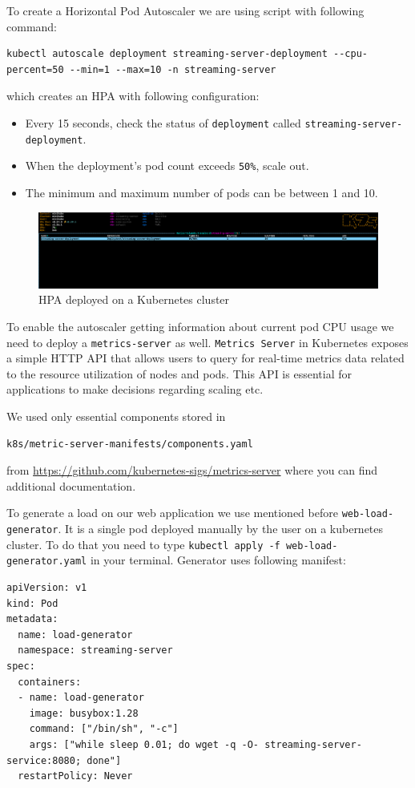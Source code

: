 \documentclass{article}
\begin{document}
To create a Horizontal Pod Autoscaler we are using script with following
command:

{\small
\begin{verbatim}
kubectl autoscale deployment streaming-server-deployment --cpu-percent=50 --min=1 --max=10 -n streaming-server
\end{verbatim}
}

which creates an HPA with following configuration:
\begin{itemize}
  \item Every 15 seconds, check the status of \texttt{deployment} called \texttt{streaming-server-deployment}.
  \item When the deployment's pod count exceeds \texttt{50\%}, scale out.
  \item The minimum and maximum number of pods can be between 1 and 10.
\end{itemize}

\begin{figure}[H]
  \centering
  \includegraphics[width=\textwidth]{images/7_hpa_on_k8s.png}
  \caption{HPA deployed on a Kubernetes cluster}
  \end{figure}

To enable the autoscaler getting information about current pod CPU usage
we need to deploy a \texttt{metrics-server} as well.
\texttt{Metrics\ Server} in Kubernetes exposes a simple HTTP API that
allows users to query for real-time metrics data related to the resource
utilization of nodes and pods. This API is essential for applications to
make decisions regarding scaling etc.

We used only essential components stored in

\begin{verbatim}
k8s/metric-server-manifests/components.yaml
\end{verbatim}

from \href{metrics server github}{https://github.com/kubernetes-sigs/metrics-server} where you can
find additional documentation.

To generate a load on our web application we use mentioned before
\texttt{web-load-generator}. It is a single pod deployed manually by the
user on a kubernetes cluster. To do that you need to type
\newline\texttt{kubectl\ apply\ -f\ web-load-generator.yaml} in your terminal.
\newline Generator uses following manifest:
\begin{verbatim}
apiVersion: v1
kind: Pod
metadata:
  name: load-generator
  namespace: streaming-server
spec:
  containers:
  - name: load-generator
    image: busybox:1.28
    command: ["/bin/sh", "-c"]
    args: ["while sleep 0.01; do wget -q -O- streaming-server-service:8080; done"]
  restartPolicy: Never
\end{verbatim}
\end{document}
